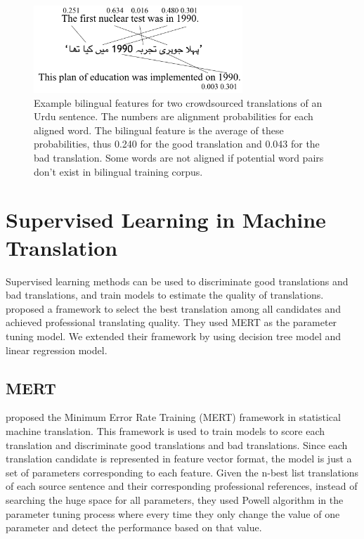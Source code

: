 \begin{figure}[!htb]
  \centering
  \includegraphics[width=0.7\textwidth]{bilingualexample/example.png}
  \caption{Example bilingual features for two crowdsourced translations of an Urdu sentence. The numbers are alignment probabilities for each aligned word. The bilingual feature is the average of these probabilities, thus 0.240 for the good translation and 0.043 for the bad translation. Some words are not aligned if potential word pairs don't exist in bilingual training corpus.
}
    \label{biexample1}
\end{figure}

\section{Supervised Learning in Machine Translation}
Supervised learning methods can be used to discriminate good translations and bad translations, and train models to estimate the quality of translations. \cite{zaidan-callisonburch:2011:ACL-HLT2011a} proposed a framework to select the best translation among all candidates and achieved professional translating quality. They used MERT as the parameter tuning model. We extended their framework by using decision tree model and linear regression model.

\subsection{MERT}

 proposed the Minimum Error Rate Training (MERT) framework in statistical machine translation. This framework is used to train models to score each translation and discriminate good translations and bad translations. Since each translation candidate is represented in feature vector format, the model is just a set of parameters corresponding to each feature. Given the n-best list translations of each source sentence and their corresponding professional references, instead of searching the huge space for all parameters, they used Powell algorithm \cite{powellefficient} in the parameter tuning process where every time they only change the value of one parameter and detect the performance based on that value. 

